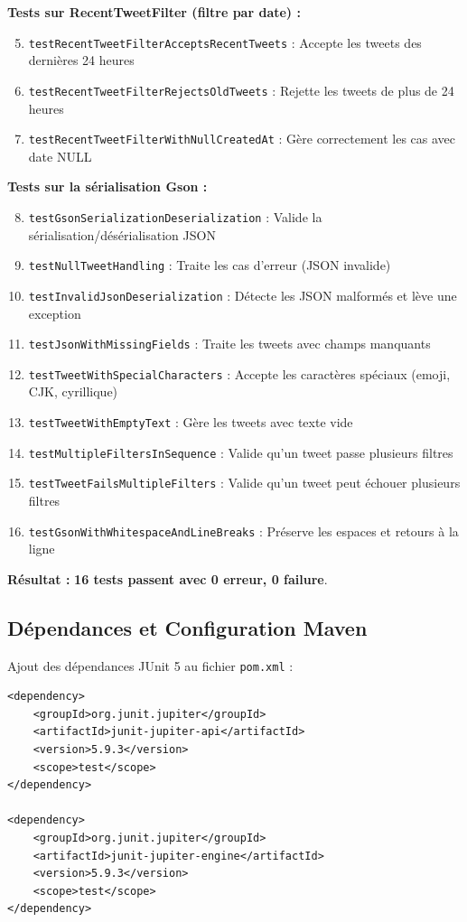 \documentclass[10pt,a4paper]{article}
\begin{document}
\textbf{Tests sur RecentTweetFilter (filtre par date) :}
\begin{enumerate}
    \setcounter{enumi}{4}
    \item \texttt{testRecentTweetFilterAcceptsRecentTweets} : Accepte les tweets des dernières 24 heures
    \item \texttt{testRecentTweetFilterRejectsOldTweets} : Rejette les tweets de plus de 24 heures
    \item \texttt{testRecentTweetFilterWithNullCreatedAt} : Gère correctement les cas avec date NULL
\end{enumerate}

\textbf{Tests sur la sérialisation Gson :}
\begin{enumerate}
    \setcounter{enumi}{7}
    \item \texttt{testGsonSerializationDeserialization} : Valide la sérialisation/désérialisation JSON
    \item \texttt{testNullTweetHandling} : Traite les cas d'erreur (JSON invalide)
    \item \texttt{testInvalidJsonDeserialization} : Détecte les JSON malformés et lève une exception
    \item \texttt{testJsonWithMissingFields} : Traite les tweets avec champs manquants
    \item \texttt{testTweetWithSpecialCharacters} : Accepte les caractères spéciaux (emoji, CJK, cyrillique)
    \item \texttt{testTweetWithEmptyText} : Gère les tweets avec texte vide
    \item \texttt{testMultipleFiltersInSequence} : Valide qu'un tweet passe plusieurs filtres
    \item \texttt{testTweetFailsMultipleFilters} : Valide qu'un tweet peut échouer plusieurs filtres
    \item \texttt{testGsonWithWhitespaceAndLineBreaks} : Préserve les espaces et retours à la ligne
\end{enumerate}

\textbf{Résultat :} \textbf{16 tests passent avec 0 erreur, 0 failure}.

\subsection{Dépendances et Configuration Maven}

Ajout des dépendances JUnit 5 au fichier \texttt{pom.xml} :

\begin{verbatim}
<dependency>
    <groupId>org.junit.jupiter</groupId>
    <artifactId>junit-jupiter-api</artifactId>
    <version>5.9.3</version>
    <scope>test</scope>
</dependency>

<dependency>
    <groupId>org.junit.jupiter</groupId>
    <artifactId>junit-jupiter-engine</artifactId>
    <version>5.9.3</version>
    <scope>test</scope>
</dependency>
\end{verbatim}
\end{document}

